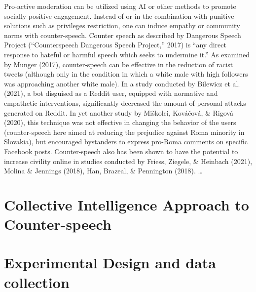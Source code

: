 \documentclass[
  10pt,
  dvipsnames,enabledeprecatedfontcommands]{scrartcl}
\begin{document}
Pro-active moderation can be utilized using AI or other methods to
promote socially positive engagement. Instead of or in the combination
with punitive solutions such as privileges restriction, one can induce
empathy or community norms with counter-speech. Counter speech as
described by Dangerous Speech Project ({``Counterspeech {{}} {Dangerous}
{Speech} {Project},''} 2017) is ``any direct response to hateful or
harmful speech which seeks to undermine it.'' As examined by Munger
(2017), counter-speech can be effective in the reduction of racist
tweets (although only in the condition in which a white male with high
followers was approaching another white male). In a study conducted by
Bilewicz et al. (2021), a bot disguised as a Reddit user, equipped with
normative and empathetic interventions, significantly decreased the
amount of personal attacks generated on Reddit. In yet another study by
Miškolci, Kováčová, \& Rigová (2020), this technique was not effective
in changing the behavior of the users (counter-speech here aimed at
reducing the prejudice against Roma minority in Slovakia), but
encouraged bystanders to express pro-Roma comments on specific Facebook
posts. Counter-speech also has been shown to have the potential to
increase civility online in studies conducted by Friess, Ziegele, \&
Heinbach (2021), Molina \& Jennings (2018), Han, Brazeal, \& Pennington
(2018). \ldots{}

\hypertarget{collective-intelligence-approach-to-counter-speech}{%
\section{Collective Intelligence Approach to
Counter-speech}\label{collective-intelligence-approach-to-counter-speech}}

\hypertarget{experimental-design-and-data-collection}{%
\section{Experimental Design and data
collection}\label{experimental-design-and-data-collection}}
\end{document}
